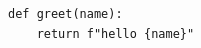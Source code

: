 \documentclass{article}
\begin{document}
\begin{verbatim}
def greet(name):
    return f"hello {name}"
\end{verbatim}
\end{document}
